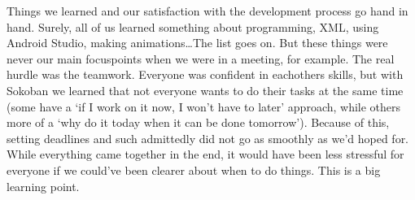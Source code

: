 \documentclass[../main.tex]{subfiles}
\begin{document}
\bigbreak\noindent
Things we learned and our satisfaction with the development process go hand in hand. Surely, all of us learned something about programming, XML, using Android Studio, making animations\dots The list goes on. But these things were never our main focuspoints when we were in a meeting, for example. The real hurdle was the teamwork. Everyone was confident in eachothers skills, but with Sokoban we learned that not everyone wants to do their tasks at the same time (some have a `if I work on it now, I won't have to later' approach, while others more of a `why do it today when it can be done tomorrow'). Because of this, setting deadlines and such admittedly did not go as smoothly as we'd hoped for. While everything came together in the end, it would have been less stressful for everyone if we could've been clearer about when to do things. This is a big learning point.
\end{document}
